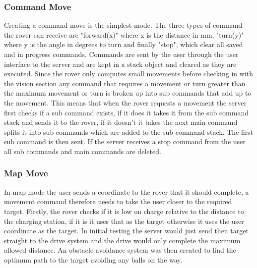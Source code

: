 \documentclass[10pt,twoside]{article}
\begin{document}
\subsubsection{Command Move}
Creating a command move is the simplest mode. The three types of command the rover can receive are "forward(x)" where x is the distance in mm, "turn(y)" where y is the angle in degrees to turn and finally "stop", which clear all saved and in progress commands. Commands are sent by the user through the user interface to the server and are kept in a stack object and cleared as they are executed. Since the rover only computes small movements before checking in with the vision section any command that requires a movement or turn greater than the maximum movement or turn is broken up into sub commands that add up to the movement. This means that when the rover requests a movement the server first checks if a sub command exists, if it does it takes it from the sub command stack and sends it to the rover, if it doesn't it takes the next main command splits it into sub-commands which are added to the sub command stack. The first sub command is then sent. If the server receives a stop command from the user all sub commands and main commands are deleted.

\subsubsection{Map Move}
In map mode the user sends a coordinate to the rover that it should complete, a movement command therefore  needs to take the user closer to the required target. Firstly, the rover checks if it is low on charge relative to the distance to the charging station, if it is it uses that as the target otherwise it uses the user coordinate as the target. In initial testing the server would just send then target straight to the drive system and the drive would only complete the maximum allowed distance. An obstacle avoidance system was then created to find the optimum path to the target avoiding any balls on the way.
\end{document}
